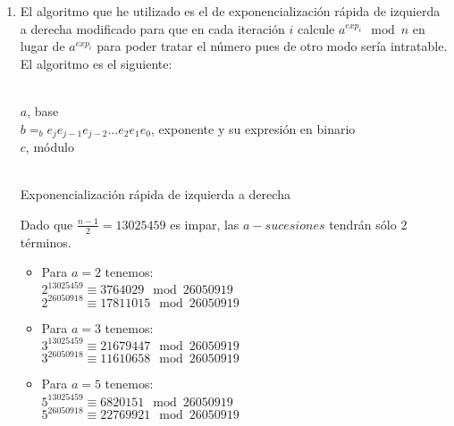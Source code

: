 	\begin{enumerate}
		\item El algoritmo que he utilizado es el de exponencialización rápida de izquierda a derecha modificado
		para que en cada iteración $i$ calcule $a^{exp_i} \mod{n}$ en lugar de $a^{exp_i}$ para poder tratar el
		número pues de otro modo sería intratable. El algoritmo es el siguiente:
		\begin{algorithm}[H]
			\begin{algorithmic}[1]
				\REQUIRE \ \\
					\texttt{$a$}, base \\
					\texttt{$b =_b e_je_{j-1}e_{j-2}\dots e_2e_1e_0$}, exponente y su expresión en binario \\
					\texttt{$c$}, módulo\\ \
					\ENDIF
				\ENDWHILE
			\end{algorithmic}
			\caption{Exponencialización rápida de izquierda a derecha}
			\label{Fast-exp}
		\end{algorithm}
		
		Dado que $\displaystyle \frac{n-1}{2} = 13025459$ es impar, las $a-sucesiones$ tendrán sólo 2 términos.
		
		\begin{itemize}
			\item Para $a = 2$ tenemos:\\
				$2^{13025459} \equiv 3764029 \mod{26050919}$\\
				$2^{26050918} \equiv 17811015 \mod{26050919}$\\
				
			\item Para $a = 3$ tenemos:\\
				$3^{13025459} \equiv 21679447 \mod{26050919}$\\
				$3^{26050918} \equiv 11610658 \mod{26050919}$\\
				
			\item Para $a = 5$ tenemos:\\
				$5^{13025459} \equiv 6820151 \mod{26050919}$\\
				$5^{26050918} \equiv 22769921 \mod{26050919}$\\
				

\end{itemize}
\end{enumerate}
